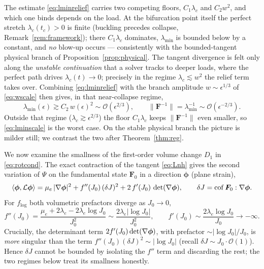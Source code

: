 The estimate \eqref{eq:lminrelief} carries two competing floors, $C_1\lambda_c$ and $C_2 w^2$, and which one binds
depends on the load. At the bifurcation point itself the perfect stretch $\lambda_c(t_c)>0$ is finite (buckling
precedes collapse, Remark~\ref{rem:framework}); there $C_1\lambda_c$ dominates, $\lambda_{\min}$ is bounded below by a
constant, and \emph{no} blow-up occurs --- consistently with the bounded-tangent physical branch of
Proposition~\ref{prop:physical}. The tangent divergence is felt only along the \emph{unstable continuation} that a
solver tracks to deeper loads, where the perfect path drives $\lambda_c(t)\to0$; precisely in the regime
$\lambda_c\lesssim w^2$ the relief term takes over. Combining \eqref{eq:lminrelief} with the branch amplitude
$w\sim\epsilon^{1/3}$ of \eqref{eq:wscale} then gives, in that near-collapse regime,
\begin{equation}
    \label{eq:lminscale}
    \lambda_{\min}(\epsilon) \gtrsim C_2\,w(\epsilon)^2 \sim \mathcal{O}(\epsilon^{2/3}),
    \qquad \|\bm{F}^{-1}\| = \lambda_{\min}^{-1} \sim \mathcal{O}(\epsilon^{-2/3}) .
\end{equation}
Outside that regime ($\lambda_c\gtrsim\epsilon^{2/3}$) the floor $C_1\lambda_c$ keeps $\|\bm{F}^{-1}\|$ even smaller, so
\eqref{eq:lminscale} is the worst case. On the stable physical branch the picture is milder still; we contrast the two
after Theorem~\ref{thm:reg}.

We now examine the smallness of the first-order volume change $D_1$ in \eqref{eq:rotcond}. The exact contraction of
the tangent \eqref{eq:Lnh} gives the second variation of $\Psi$ on the fundamental state $\bm{F}_0$ in a direction
$\bm{\phi}$ (plane strain),
\begin{equation}
    \label{eq:secondvar}
    \langle\bm{\phi},\mathcal{L}\bm{\phi}\rangle
    = \mu_e\,|\nabla\bm{\phi}|^2 + f''(J_0)\,(\delta J)^2 + 2\,f'(J_0)\,\det(\nabla\bm{\phi}),
    \qquad \delta J=\operatorname{cof}\bm{F}_0:\nabla\bm{\phi}.
\end{equation}
For $f_{\log}$ both volumetric prefactors diverge as $J_0\to0$,
\begin{equation}
    \label{eq:fppblow}
    f''(J_0)=\frac{\mu_e+2\lambda_e-2\lambda_e\log J_0}{J_0^2}\sim\frac{2\lambda_e|\log J_0|}{J_0^2},
    \qquad f'(J_0)\sim\frac{2\lambda_e\log J_0}{J_0}\to-\infty .
\end{equation}
Crucially, the determinant term $2f'(J_0)\det(\nabla\bm{\phi})$, with prefactor $\sim|\log J_0|/J_0$, is \emph{more}
singular than the term $f''(J_0)(\delta J)^2\sim|\log J_0|$ (recall $\delta J\sim J_0\cdot\mathcal{O}(1)$). Hence
$\delta J$ cannot be bounded by isolating the $f''$ term and discarding the rest; the two regimes below treat its
smallness honestly.

